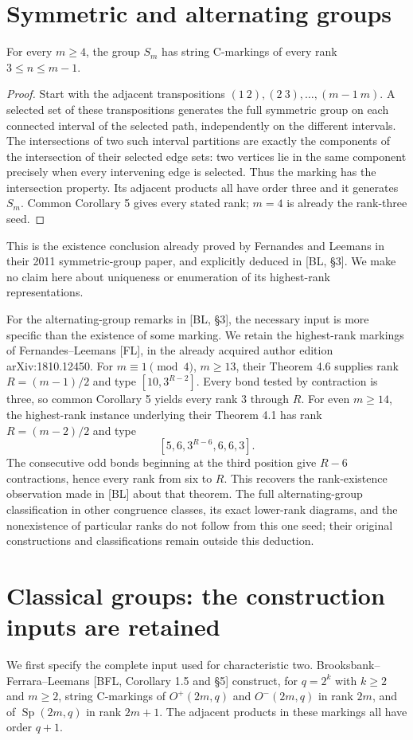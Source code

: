 \documentclass[a4paper,11pt]{article}
\begin{document}
\section{Symmetric and alternating groups}
\begin{proposition}\label{symmetric}
For every $m\geq4$, the group $S_m$ has string C-markings of every
rank $3\leq n\leq m-1$.
\end{proposition}
\begin{proof}
Start with the adjacent transpositions
$(1\ 2),(2\ 3),\ldots,(m-1\ m)$. A selected set of these transpositions
generates the full symmetric group on each connected interval of the
selected path, independently on the different intervals. The intersections
of two such interval partitions are exactly the components of the
intersection of their selected edge sets: two vertices lie in the same
component precisely when every intervening edge is selected. Thus the
marking has the intersection property. Its adjacent products all have
order three and it generates $S_m$. Common Corollary 5 gives every stated
rank; $m=4$ is already the rank-three seed.
\end{proof}
This is the existence conclusion already proved by Fernandes and Leemans
in their 2011 symmetric-group paper, and explicitly deduced in [BL, \S3].
We make no claim here about uniqueness or enumeration of its highest-rank
representations.

For the alternating-group remarks in [BL, \S3], the necessary input is
more specific than the existence of some marking. We retain the highest-rank
markings of Fernandes--Leemans [FL], in the already acquired author edition
arXiv:1810.12450. For $m\equiv1\pmod4$, $m\geq13$, their Theorem 4.6
supplies rank $R=(m-1)/2$ and type $[10,3^{R-2}]$. Every bond tested by
contraction is three, so common Corollary 5 yields every rank $3$ through $R$.
For even $m\geq14$, the highest-rank instance underlying their Theorem 4.1
has rank $R=(m-2)/2$ and type
\[
 [5,6,3^{R-6},6,6,3].
\]
The consecutive odd bonds beginning at the third position give $R-6$
contractions, hence every rank from six to $R$. This recovers the
rank-existence observation made in [BL] about that theorem. The full
alternating-group classification in other congruence classes, its exact
lower-rank diagrams, and the nonexistence of particular ranks do not follow
from this one seed; their original constructions and classifications remain
outside this deduction.

\section{Classical groups: the construction inputs are retained}
We first specify the complete input used for characteristic two.
Brooksbank--Ferrara--Leemans [BFL, Corollary 1.5 and \S5] construct, for
$q=2^k$ with $k\geq2$ and $m\geq2$, string C-markings of
$O^+(2m,q)$ and $O^-(2m,q)$ in rank $2m$, and of
$\operatorname{Sp}(2m,q)$ in rank $2m+1$. The adjacent products in these
markings all have order $q+1$.
\end{document}
